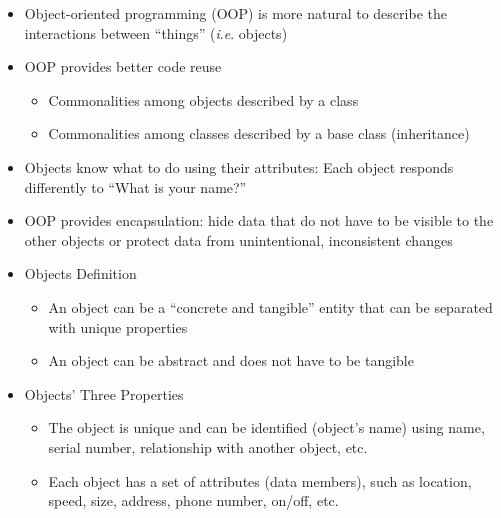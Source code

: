 \begin{itemize}

  \item Object-oriented programming (OOP) is more natural to describe the interactions between ``things'' (\textit{i}.\textit{e}. objects)

  \item OOP provides better code reuse

    \begin{itemize}

      \item Commonalities among objects described by a class
        
      \item Commonalities among classes described by a base class (inheritance)
        
    \end{itemize}

  \item Objects know what to do using their attributes: Each object responds differently to ``What is your name?''

  \item OOP provides encapsulation: hide data that do not have to be visible to the other objects or protect data from unintentional, inconsistent changes

  \item Objects Definition

    \begin{itemize}

      \item An object can be a ``concrete and tangible'' entity that can be separated with unique properties

      \item An object can be abstract and does not have to be tangible

    \end{itemize}

  \item Objects' Three Properties

    \begin{itemize}

      \item The  object is unique and can be identified (object's name) using name, serial number, relationship with another object, etc.

      \item Each object has a set of attributes (data members), such as location, speed, size, address, phone number, on/off, etc.


\end{itemize}
\end{itemize}
